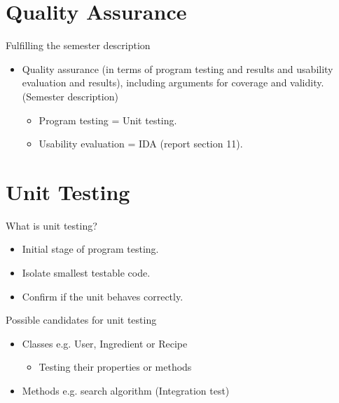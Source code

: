 \section{Quality Assurance}

\begin{frame} {Fulfilling the semester description}
	\begin{itemize}
		\item Quality assurance (in terms of program testing and results and usability evaluation and results), including arguments for coverage and validity. {\footnotesize (Semester description)}
		\begin{itemize}
			\item Program testing = Unit testing.
			\item Usability evaluation = IDA (report section 11).
		\end{itemize}				
	\end{itemize}

\end{frame}

\section{Unit Testing}

\begin{frame} {What is unit testing?}
	\begin{itemize}
		\item Initial stage of program testing.
		\item Isolate smallest testable code.
		\item Confirm if the unit behaves correctly.
	\end{itemize}
\end{frame}

\begin{frame} {Possible candidates for unit testing}

	\begin{itemize}
		\item Classes e.g. User, Ingredient or Recipe
			\begin{itemize}
				\item Testing their properties or methods
			\end{itemize}					
		\item Methods e.g. search algorithm (Integration test)
	\end{itemize}

\end{frame}